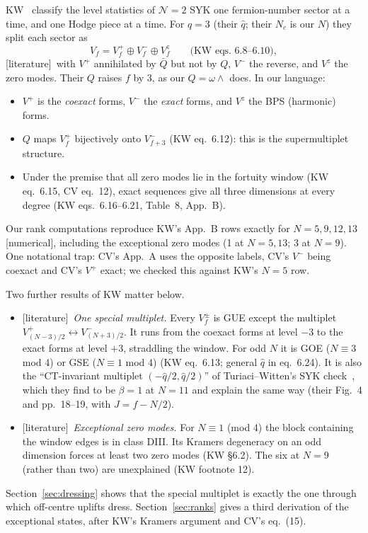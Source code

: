 \documentclass[11pt]{article}
\newcommand{\tagbox}[2]{\textsf{\small\color{#1}[#2]}}
\newcommand{\EST}{\tagbox{cest}{literature}}
\newcommand{\NUM}{\tagbox{cnum}{numerical}}
\theoremstyle{plain}
\theoremstyle{remark}
\numberwithin{equation}{section}
\begin{document}
KW~\cite{KW} classify the level statistics of $\mathcal N=2$ SYK one fermion-number sector at a time, and one Hodge piece
at a time. For $q=3$ (their $\hat q$; their $N_c$ is our $N$) they split each sector as
\begin{equation}
V_f=V_f^+\oplus V_f^-\oplus V_f^z\qquad\text{(KW eqs.~6.8--6.10)},
\end{equation}
\EST\ with $V^+$ annihilated by $\bar Q$ but not by $Q$, $V^-$ the reverse, and $V^z$ the zero modes. Their $Q$ raises $f$
by 3, as our $Q=\omega\wedge$ does. In our language:
\begin{itemize}\itemsep1pt
\item $V^+$ is the \emph{coexact} forms, $V^-$ the \emph{exact} forms, and $V^z$ the BPS (harmonic) forms.
\item $Q$ maps $V_f^+$ bijectively onto $V^-_{f+3}$ (KW eq.~6.12): this is the supermultiplet structure.
\item Under the premise that all zero modes lie in the fortuity window (KW eq.~6.15, CV eq.~12), exact sequences give
all three dimensions at every degree (KW eqs.~6.16--6.21, Table~8, App.~B).
\end{itemize}
Our rank computations reproduce KW's App.~B rows exactly for $N=5,9,12,13$ \NUM, including the exceptional zero modes
(1 at $N=5,13$; 3 at $N=9$). One notational trap: CV's App.~A uses the opposite labels, CV's $V^-$ being coexact and CV's
$V^+$ exact; we checked this against KW's $N=5$ row.

Two further results of KW matter below.
\begin{itemize}\itemsep1pt
\item \EST\ \emph{One special multiplet.} Every $V^\pm_f$ is GUE except the multiplet $V^+_{(N-3)/2}\leftrightarrow
V^-_{(N+3)/2}$. It runs from the coexact forms at level $-3$ to the exact forms at level $+3$, straddling the window. For
odd $N$ it is GOE ($N\equiv3$ mod 4) or GSE ($N\equiv1$ mod 4) (KW eq.~6.13; general $\hat q$ in eq.~6.24).
It is also the ``CT-invariant multiplet $(-\hat q/2,\hat q/2)$'' of Turiaci--Witten's SYK check~\cite{TW}, which they
find to be $\beta=1$ at $N=11$ and explain the same way (their Fig.~4 and pp.~18--19, with $J=f-N/2$).
\item \EST\ \emph{Exceptional zero modes.} For $N\equiv1$ (mod 4) the block containing the window edges is in class DIII.
Its Kramers degeneracy on an odd dimension forces at least two zero modes (KW \S6.2). The six at $N=9$ (rather than two)
are unexplained (KW footnote 12).
\end{itemize}
Section~\ref{sec:dressing} shows that the special multiplet is exactly the one through which off-centre uplifts dress.
Section~\ref{sec:ranks} gives a third derivation of the exceptional states, after KW's Kramers argument and CV's eq.~(15).
\end{document}
